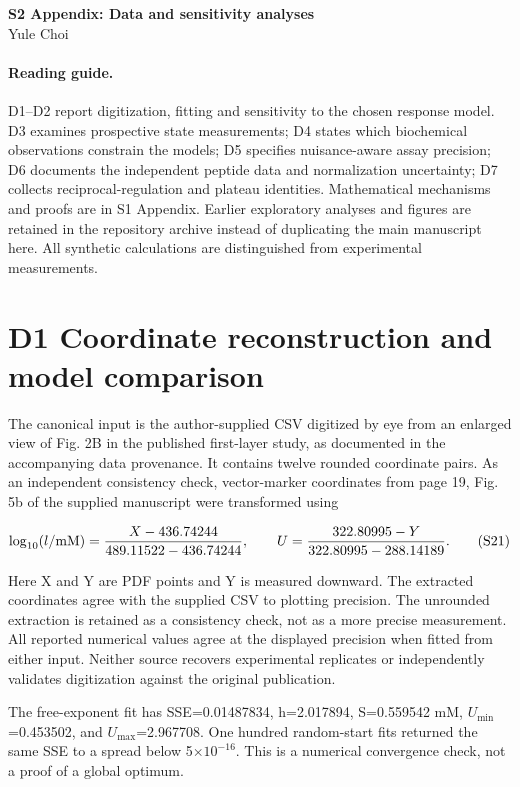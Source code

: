 \documentclass[11pt]{article}
\begin{document}
\begin{center}{\Large\bfseries S2 Appendix: Data and sensitivity analyses}\\[0.5em]Yule Choi\end{center}
\onehalfspacing
\paragraph{Reading guide.} D1--D2 report digitization, fitting and sensitivity to the chosen response model. D3 examines prospective state measurements; D4 states which biochemical observations constrain the models; D5 specifies nuisance-aware assay precision; D6 documents the independent peptide data and normalization uncertainty; D7 collects reciprocal-regulation and plateau identities. Mathematical mechanisms and proofs are in S1 Appendix. Earlier exploratory analyses and figures are retained in the repository archive instead of duplicating the main manuscript here. All synthetic calculations are distinguished from experimental measurements.
\section*{D1 Coordinate reconstruction and model comparison}

The canonical input is the author-supplied CSV digitized by eye from an enlarged view of Fig. 2B in the published first-layer study, as documented in the accompanying data provenance. It contains twelve rounded coordinate pairs. As an independent consistency check, vector-marker coordinates from page 19, Fig. 5b of the supplied manuscript were transformed using


\[
\log_{10}(l/{\rm mM})=\frac{X-436.74244}{489.11522-436.74244},\qquad
U=\frac{322.80995-Y}{322.80995-288.14189}. \tag{S21}
\]

Here X and Y are PDF points and Y is measured downward. The extracted coordinates agree with the supplied CSV to plotting precision. The unrounded extraction is retained as a consistency check, not as a more precise measurement. All reported numerical values agree at the displayed precision when fitted from either input. Neither source recovers experimental replicates or independently validates digitization against the original publication.


The free-exponent fit has SSE=0.01487834, h=2.017894, S=0.559542 mM, $U_{\min}$=0.453502, and $U_{\max}$=2.967708. One hundred random-start fits returned the same SSE to a spread below 5$\times$$10^{-16}$. This is a numerical convergence check, not a proof of a global optimum.
\end{document}

